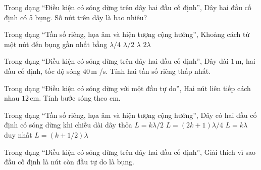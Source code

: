 \begin{ex}
Trong dạng “Điều kiện có sóng dừng trên dây hai đầu cố định”, Dây hai đầu cố định có 5 bụng. Số nút trên dây là bao nhiêu?
\end{ex}

\begin{ex}
Trong dạng “Tần số riêng, họa âm và hiện tượng cộng hưởng”, Khoảng cách từ một nút đến bụng gần nhất bằng
\choice
{\True $\lambda/4$}
{$\lambda/2$}
{$\lambda$}
{$2\lambda$}
\end{ex}

\begin{ex}
Trong dạng “Điều kiện có sóng dừng trên dây hai đầu cố định”, Dây dài $1\,\text{m}$, hai đầu cố định, tốc độ sóng $40\,\text{m}$ /s. Tính hai tần số riêng thấp nhất.
\choiceTF

\end{ex}

\begin{ex}
Trong dạng “Điều kiện có sóng dừng với một đầu tự do”, Hai nút liên tiếp cách nhau $12\,\text{cm}$. Tính bước sóng theo cm.
\end{ex}

\begin{ex}
Trong dạng “Tần số riêng, họa âm và hiện tượng cộng hưởng”, Dây có hai đầu cố định có sóng dừng khi chiều dài dây thỏa
\choice
{\True $L=k\lambda/2$}
{$L=(2k+1)\lambda/4$}
{$L=k\lambda$ duy nhất}
{$L=(k+1/2)\lambda$}
\end{ex}

\begin{ex}
Trong dạng “Điều kiện có sóng dừng trên dây hai đầu cố định”, Giải thích vì sao đầu cố định là nút còn đầu tự do là bụng.
\choiceTF

\end{ex}

